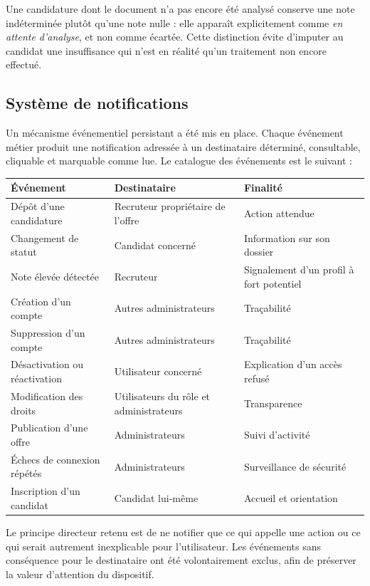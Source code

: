 \documentclass[11pt,a4paper]{article}
\begin{document}
Une candidature dont le document n'a pas encore été analysé conserve une note indéterminée plutôt qu'une note nulle : elle apparaît explicitement comme \emph{en attente d'analyse}, et non comme écartée. Cette distinction évite d'imputer au candidat une insuffisance qui n'est en réalité qu'un traitement non encore effectué.

\subsection{Système de notifications}
Un mécanisme événementiel persistant a été mis en place. Chaque événement métier produit une notification adressée à un destinataire déterminé, consultable, cliquable et marquable comme lue. Le catalogue des événements est le suivant :

\begin{center}
\begin{tabular}{p{5.2cm}p{4.4cm}p{4.4cm}}
  \toprule
  \textbf{Événement} & \textbf{Destinataire} & \textbf{Finalité} \\
  \midrule
  Dépôt d'une candidature & Recruteur propriétaire de l'offre & Action attendue \\
  Changement de statut & Candidat concerné & Information sur son dossier \\
  Note élevée détectée & Recruteur & Signalement d'un profil à fort potentiel \\
  Création d'un compte & Autres administrateurs & Traçabilité \\
  Suppression d'un compte & Autres administrateurs & Traçabilité \\
  Désactivation ou réactivation & Utilisateur concerné & Explication d'un accès refusé \\
  Modification des droits & Utilisateurs du rôle et administrateurs & Transparence \\
  Publication d'une offre & Administrateurs & Suivi d'activité \\
  Échecs de connexion répétés & Administrateurs & Surveillance de sécurité \\
  Inscription d'un candidat & Candidat lui-même & Accueil et orientation \\
  \bottomrule
\end{tabular}
\end{center}

\vspace{2mm}
\noindent Le principe directeur retenu est de ne notifier que ce qui appelle une action ou ce qui serait autrement inexplicable pour l'utilisateur. Les événements sans conséquence pour le destinataire ont été volontairement exclus, afin de préserver la valeur d'attention du dispositif.
\end{document}
